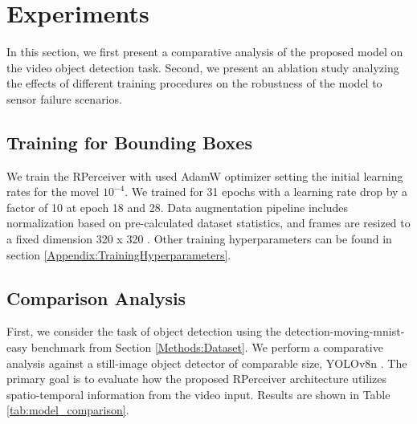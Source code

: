 \section{Experiments}  \label{Experiments}

In this section, we first present a comparative analysis of the proposed model on the video object detection task. Second, we present an ablation study analyzing the effects of different training procedures on the robustness of the model to sensor failure scenarios.

\subsection{Training for Bounding Boxes} \label{Experiments:TrainingBoundingBoxes}

We train the RPerceiver with used AdamW optimizer \cite{loshchilovDecoupledWeightDecay2019a} setting the initial learning rates for the movel $ 10^{-4} $. We trained for 31 epochs with a learning rate drop by a factor of 10 at epoch 18 and 28. Data augmentation pipeline includes normalization based on pre-calculated dataset statistics, and frames are resized to a fixed dimension 320 x 320 \cite{redmonYOLO9000BetterFaster2016}. Other training hyperparameters can be found in section \ref{Appendix:TrainingHyperparameters}.

\subsection{Comparison Analysis} \label{Experiments:ComparisonAnalysis}

First, we consider the task of object detection using the detection-moving-mnist-easy benchmark from Section \ref{Methods:Dataset}. We perform a comparative analysis against a still-image object detector of comparable size, YOLOv8n \cite{Jocher_Ultralytics_YOLO_2023}. The primary goal is to evaluate how the proposed RPerceiver architecture utilizes spatio-temporal information from the video input. Results are shown in Table \ref{tab:model_comparison}.


